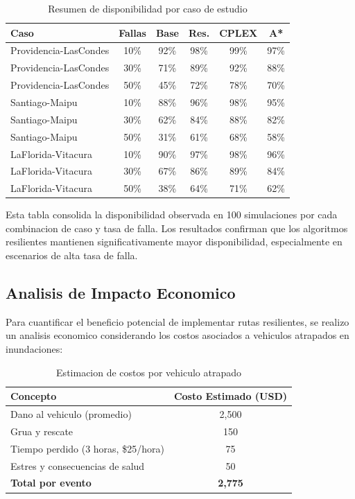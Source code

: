 \documentclass[conference]{IEEEtran}
\begin{document}
\begin{table}[!t]
\centering
\caption{Resumen de disponibilidad por caso de estudio}
\begin{tabular}{@{}lccccc@{}}
\toprule
\textbf{Caso} & \textbf{Fallas} & \textbf{Base} & \textbf{Res.} & \textbf{CPLEX} & \textbf{A*} \\
\midrule
Providencia-LasCondes & 10\% & 92\% & 98\% & 99\% & 97\% \\
Providencia-LasCondes & 30\% & 71\% & 89\% & 92\% & 88\% \\
Providencia-LasCondes & 50\% & 45\% & 72\% & 78\% & 70\% \\
\midrule
Santiago-Maipu & 10\% & 88\% & 96\% & 98\% & 95\% \\
Santiago-Maipu & 30\% & 62\% & 84\% & 88\% & 82\% \\
Santiago-Maipu & 50\% & 31\% & 61\% & 68\% & 58\% \\
\midrule
LaFlorida-Vitacura & 10\% & 90\% & 97\% & 98\% & 96\% \\
LaFlorida-Vitacura & 30\% & 67\% & 86\% & 89\% & 84\% \\
LaFlorida-Vitacura & 50\% & 38\% & 64\% & 71\% & 62\% \\
\bottomrule
\end{tabular}
\end{table}

Esta tabla consolida la disponibilidad observada en 100 simulaciones por cada combinacion de caso y tasa de falla. Los resultados confirman que los algoritmos resilientes mantienen significativamente mayor disponibilidad, especialmente en escenarios de alta tasa de falla.

\subsection{Analisis de Impacto Economico}

Para cuantificar el beneficio potencial de implementar rutas resilientes, se realizo un analisis economico considerando los costos asociados a vehiculos atrapados en inundaciones:

\begin{table}[!t]
\centering
\caption{Estimacion de costos por vehiculo atrapado}
\begin{tabular}{@{}lc@{}}
\toprule
\textbf{Concepto} & \textbf{Costo Estimado (USD)} \\
\midrule
Dano al vehiculo (promedio) & 2,500 \\
Grua y rescate & 150 \\
Tiempo perdido (3 horas, \$25/hora) & 75 \\
Estres y consecuencias de salud & 50 \\
\midrule
\textbf{Total por evento} & \textbf{2,775} \\
\bottomrule
\end{tabular}
\end{table}
\end{document}

